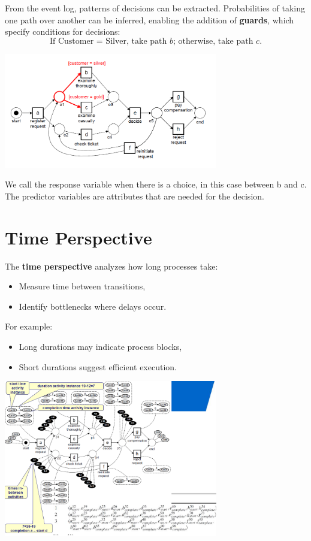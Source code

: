 From the event log, patterns of decisions can be extracted. Probabilities of taking one path over another can be inferred, enabling the addition of \textbf{guards}, which specify conditions for decisions:
\[
\text{If Customer = Silver, take path \(b\); otherwise, take path \(c\)}.
\]
\begin{center}
    \includegraphics[width=0.7\textwidth]{capitolo 8/slide40.png}
\end{center}
We call the response variable when there is a choice, in this case between b and c. The predictor variables are attributes that are needed for the decision.

\section{Time Perspective}

The \textbf{time perspective} analyzes how long processes take:
\begin{itemize}
    \item Measure time between transitions,
    \item Identify bottlenecks where delays occur.
\end{itemize}

For example:
\begin{itemize}
    \item Long durations may indicate process blocks,
    \item Short durations suggest efficient execution.
\end{itemize}

\begin{center}
    \includegraphics[width=0.7\textwidth]{capitolo 8/slide48.png}
    
\end{center}

